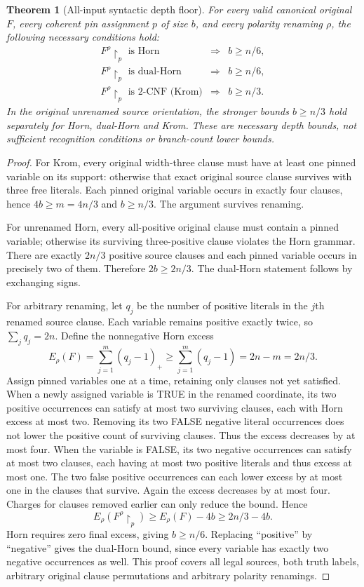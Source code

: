 \documentclass[11pt]{article}
\newtheorem{theorem}{Theorem}
\begin{document}
\begin{theorem}[All-input syntactic depth floor]\label{thm:floor}
For every valid canonical original $F$, every coherent pin assignment $p$ of size $b$, and every polarity renaming $\rho$, the following necessary conditions hold:
\[
\begin{array}{rcl}
F^\rho\upharpoonright_p\text{ is Horn}&\Longrightarrow& b\ge n/6,\\
F^\rho\upharpoonright_p\text{ is dual-Horn}&\Longrightarrow& b\ge n/6,\\
F^\rho\upharpoonright_p\text{ is 2-CNF (Krom)}&\Longrightarrow& b\ge n/3.
\end{array}
\]
In the original unrenamed source orientation, the stronger bounds $b\ge n/3$ hold separately for Horn, dual-Horn and Krom. These are necessary depth bounds, not sufficient recognition conditions or branch-count lower bounds.
\end{theorem}
\begin{proof}
For Krom, every original width-three clause must have at least one pinned variable on its support: otherwise that exact original source clause survives with three free literals. Each pinned original variable occurs in exactly four clauses, hence $4b\ge m=4n/3$ and $b\ge n/3$. The argument survives renaming.

For unrenamed Horn, every all-positive original clause must contain a pinned variable; otherwise its surviving three-positive clause violates the Horn grammar. There are exactly $2n/3$ positive source clauses and each pinned variable occurs in precisely two of them. Therefore $2b\ge 2n/3$. The dual-Horn statement follows by exchanging signs.

For arbitrary renaming, let $q_j$ be the number of positive literals in the $j$th renamed source clause. Each variable remains positive exactly twice, so $\sum_jq_j=2n$. Define the nonnegative Horn excess
\[
E_\rho(F)=\sum_{j=1}^{m}(q_j-1)_+
\ge\sum_{j=1}^{m}(q_j-1)=2n-m=2n/3.
\]
Assign pinned variables one at a time, retaining only clauses not yet satisfied. When a newly assigned variable is TRUE in the renamed coordinate, its two positive occurrences can satisfy at most two surviving clauses, each with Horn excess at most two. Removing its two FALSE negative literal occurrences does not lower the positive count of surviving clauses. Thus the excess decreases by at most four. When the variable is FALSE, its two negative occurrences can satisfy at most two clauses, each having at most two positive literals and thus excess at most one. The two false positive occurrences can each lower excess by at most one in the clauses that survive. Again the excess decreases by at most four. Charges for clauses removed earlier can only reduce the bound. Hence
\[
 E_\rho(F^\rho\upharpoonright_p)\ge E_\rho(F)-4b\ge 2n/3-4b.
\]
Horn requires zero final excess, giving $b\ge n/6$. Replacing ``positive'' by ``negative'' gives the dual-Horn bound, since every variable has exactly two negative occurrences as well. This proof covers all legal sources, both truth labels, arbitrary original clause permutations and arbitrary polarity renamings.\end{proof}
\end{document}
